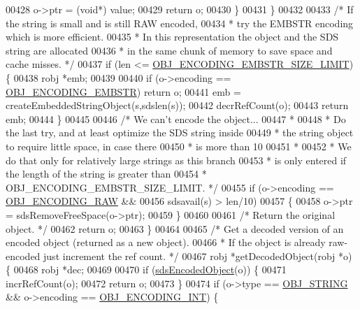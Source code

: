 \begin{DoxyCode}
00428             o->ptr = (\textcolor{keywordtype}{void}*) value;
00429             \textcolor{keywordflow}{return} o;
00430         \}
00431     \}
00432 
00433     \textcolor{comment}{/* If the string is small and is still RAW encoded,}
00434 \textcolor{comment}{     * try the EMBSTR encoding which is more efficient.}
00435 \textcolor{comment}{     * In this representation the object and the SDS string are allocated}
00436 \textcolor{comment}{     * in the same chunk of memory to save space and cache misses. */}
00437     \textcolor{keywordflow}{if} (len <= \hyperlink{object_8c_a3e762d5fac271c94b01875920ff57fb2}{OBJ\_ENCODING\_EMBSTR\_SIZE\_LIMIT}) \{
00438         robj *emb;
00439 
00440         \textcolor{keywordflow}{if} (o->encoding == \hyperlink{server_8h_ac5bb76b546161fd0da4b0ff89b3142ee}{OBJ\_ENCODING\_EMBSTR}) \textcolor{keywordflow}{return} o;
00441         emb = createEmbeddedStringObject(s,sdslen(s));
00442         decrRefCount(o);
00443         \textcolor{keywordflow}{return} emb;
00444     \}
00445 
00446     \textcolor{comment}{/* We can't encode the object...}
00447 \textcolor{comment}{     *}
00448 \textcolor{comment}{     * Do the last try, and at least optimize the SDS string inside}
00449 \textcolor{comment}{     * the string object to require little space, in case there}
00450 \textcolor{comment}{     * is more than 10%
00451 \textcolor{comment}{     *}
00452 \textcolor{comment}{     * We do that only for relatively large strings as this branch}
00453 \textcolor{comment}{     * is only entered if the length of the string is greater than}
00454 \textcolor{comment}{     * OBJ\_ENCODING\_EMBSTR\_SIZE\_LIMIT. */}
00455     \textcolor{keywordflow}{if} (o->encoding == \hyperlink{server_8h_a148bc85e3074e324a6dc5eebcad1bcd5}{OBJ\_ENCODING\_RAW} &&
00456         sdsavail(s) > len/10)
00457     \{
00458         o->ptr = sdsRemoveFreeSpace(o->ptr);
00459     \}
00460 
00461     \textcolor{comment}{/* Return the original object. */}
00462     \textcolor{keywordflow}{return} o;
00463 \}
00464 
00465 \textcolor{comment}{/* Get a decoded version of an encoded object (returned as a new object).}
00466 \textcolor{comment}{ * If the object is already raw-encoded just increment the ref count. */}
00467 robj *getDecodedObject(robj *o) \{
00468     robj *dec;
00469 
00470     \textcolor{keywordflow}{if} (\hyperlink{server_8h_afcfb5bd97af52d1dbce331745cae030c}{sdsEncodedObject}(o)) \{
00471         incrRefCount(o);
00472         \textcolor{keywordflow}{return} o;
00473     \}
00474     \textcolor{keywordflow}{if} (o->type == \hyperlink{server_8h_a65236ea160f69cdef33ec942092af88f}{OBJ\_STRING} && o->encoding == \hyperlink{server_8h_ae934cf008a0be0ef009c92c2d006a816}{OBJ\_ENCODING\_INT}) \{
}
\end{DoxyCode}
